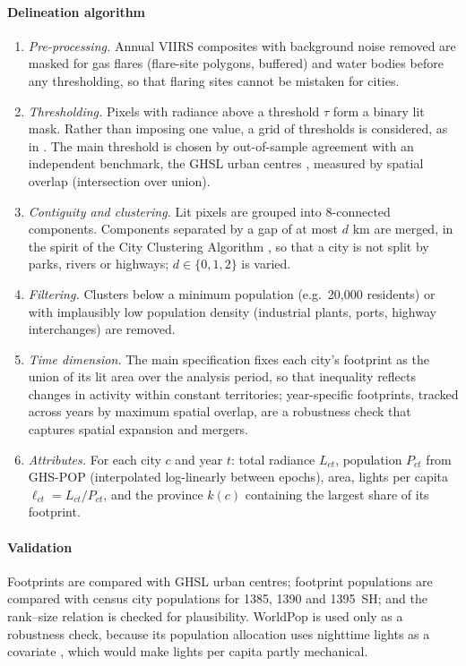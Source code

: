 \documentclass[11pt,a4paper]{article}
\begin{document}
\paragraph{Delineation algorithm}
\begin{enumerate}[label=\arabic*.]
\item \emph{Pre-processing.} Annual VIIRS composites with background noise removed are masked for gas flares (flare-site polygons, buffered) and water bodies before any thresholding, so that flaring sites cannot be mistaken for cities.
\item \emph{Thresholding.} Pixels with radiance above a threshold $\tau$ form a binary lit mask. Rather than imposing one value, a grid of thresholds is considered, as in \citet{Dingel2021}. The main threshold is chosen by out-of-sample agreement with an independent benchmark, the GHSL urban centres \citep{Dijkstra2021}, measured by spatial overlap (intersection over union).
\item \emph{Contiguity and clustering.} Lit pixels are grouped into 8-connected components. Components separated by a gap of at most $d$ km are merged, in the spirit of the City Clustering Algorithm \citep{Rozenfeld2011}, so that a city is not split by parks, rivers or highways; $d\in\{0,1,2\}$ is varied.
\item \emph{Filtering.} Clusters below a minimum population (e.g.\ 20{,}000 residents) or with implausibly low population density (industrial plants, ports, highway interchanges) are removed.
\item \emph{Time dimension.} The main specification fixes each city's footprint as the union of its lit area over the analysis period, so that inequality reflects changes in activity within constant territories; year-specific footprints, tracked across years by maximum spatial overlap, are a robustness check that captures spatial expansion and mergers.
\item \emph{Attributes.} For each city $c$ and year $t$: total radiance $L_{ct}$, population $P_{ct}$ from GHS-POP (interpolated log-linearly between epochs), area, lights per capita $\ell_{ct}=L_{ct}/P_{ct}$, and the province $k(c)$ containing the largest share of its footprint.
\end{enumerate}

\paragraph{Validation}
Footprints are compared with GHSL urban centres; footprint populations are compared with census city populations for 1385, 1390 and 1395~SH; and the rank--size relation is checked for plausibility. WorldPop is used only as a robustness check, because its population allocation uses nighttime lights as a covariate \citep{Stevens2015}, which would make lights per capita partly mechanical.
\end{document}

